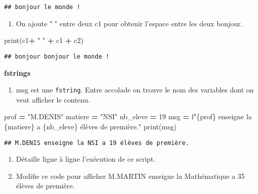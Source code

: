 \documentclass[
]{book}
\newenvironment{Shaded}{\begin{snugshade}}{\end{snugshade}}
\newcommand{\BuiltInTok}[1]{#1}
\newcommand{\DecValTok}[1]{\textcolor[rgb]{0.00,0.00,0.81}{#1}}
\newcommand{\NormalTok}[1]{#1}
\newcommand{\OperatorTok}[1]{\textcolor[rgb]{0.81,0.36,0.00}{\textbf{#1}}}
\newcommand{\SpecialCharTok}[1]{\textcolor[rgb]{0.00,0.00,0.00}{#1}}
\newcommand{\SpecialStringTok}[1]{\textcolor[rgb]{0.31,0.60,0.02}{#1}}
\newcommand{\StringTok}[1]{\textcolor[rgb]{0.31,0.60,0.02}{#1}}
\providecommand{\tightlist}{%
  \setlength{\itemsep}{0pt}\setlength{\parskip}{0pt}}
\def\tightlist{}
\begin{document}
\begin{verbatim}
## bonjour le monde !
\end{verbatim}

\begin{enumerate}
\def\labelenumi{\arabic{enumi}.}
\setcounter{enumi}{2}
\tightlist
\item
  On ajoute " " entre deux c1 pour obtenir l'espace entre les deux bonjour.
\end{enumerate}

\begin{Shaded}
\begin{Highlighting}[]
\BuiltInTok{print}\NormalTok{(c1}\OperatorTok{+} \StringTok{" "} \OperatorTok{+}\NormalTok{ c1 }\OperatorTok{+}\NormalTok{ c2)}
\end{Highlighting}
\end{Shaded}

\begin{verbatim}
## bonjour bonjour le monde !
\end{verbatim}

\textbf{fstrings}

\begin{enumerate}
\def\labelenumi{\arabic{enumi}.}
\tightlist
\item
  msg est une \texttt{fstring}. Entre accolade on trouve le nom des variables dont on veut afficher le contenu.
\end{enumerate}

\begin{Shaded}
\begin{Highlighting}[]
\NormalTok{prof }\OperatorTok{=} \StringTok{"M.DENIS"}
\NormalTok{matiere }\OperatorTok{=} \StringTok{"NSI"}
\NormalTok{nb\_eleve }\OperatorTok{=} \DecValTok{19}
\NormalTok{msg }\OperatorTok{=} \SpecialStringTok{f"}\SpecialCharTok{\{}\NormalTok{prof}\SpecialCharTok{\}}\SpecialStringTok{ enseigne la }\SpecialCharTok{\{}\NormalTok{matiere}\SpecialCharTok{\}}\SpecialStringTok{ a }\SpecialCharTok{\{}\NormalTok{nb\_eleve}\SpecialCharTok{\}}\SpecialStringTok{ élèves de première."} 
\BuiltInTok{print}\NormalTok{(msg)}
\end{Highlighting}
\end{Shaded}

\begin{verbatim}
## M.DENIS enseigne la NSI a 19 élèves de première.
\end{verbatim}

\begin{enumerate}
\def\labelenumi{\arabic{enumi}.}
\setcounter{enumi}{1}
\tightlist
\item
  Détaille ligne à ligne l'exécution de ce script.
\item
  Modifie ce code pour afficher M.MARTIN enseigne la Mathématique a 35 élèves de première.
\end{enumerate}
\end{document}
